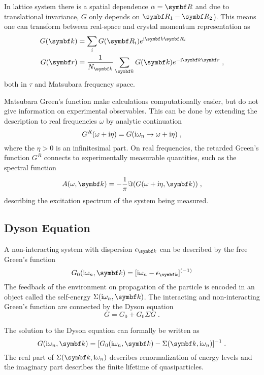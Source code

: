 \documentclass[../notes.tex]{subfiles}
\begin{document}
In lattice system there is a spatial dependence \(\alpha = \vb{R}\) and due to translational invariance, \(G\) only depends on \(\vb{R}_1 - \vb{R}_2\)).
This means one can transform between real-space and crystal momentum representation as
\begin{align}
	G (\vb{k}) &= \sum_i G(\vb{R}_i) e^{\iu \vb{k} \vb{R}_i} \\
	G(\vb{r}) &= \frac{1}{N_{\vb{k}}} \sum_{\vb{k}} G(\vb{k}) e^{-\iu \vb{k} \vb{r}} \;,
\end{align}
both in \(\tau\) and Matsubara frequency space.

Matsubara Green's function make calculations computationally easier, but do not give information on experimental observables.
This can be done by extending the description to real frequencies \(\omega\) by analytic continuation \cite{bruusManyBodyQuantumTheory2004}
\begin{equation}
	G^R (\omega + \mathrm{i} \eta) = G (\mathrm{i} \omega_n \to \omega + \mathrm{i} \eta) \;,
\end{equation}
where the \(\eta > 0\) is an infinitesimal part.
On real frequencies, the retarded Green's function \(G^R\) connects to experimentally measurable quantities, such as the spectral function
\begin{equation}
	A (\omega, \vb{k}) = -\frac{1}{\pi} \Im (G (\omega + \iu \eta, \vb{k})) \;,
\end{equation}
describing the excitation spectrum of the system being measured.

\subsection*{Dyson Equation}

A non-interacting system with dispersion \(\epsilon_{\vb{k}}\) can be described by the free Green's function
\begin{equation}
	G_0 (\iu \omega_n, \vb{k}) = [\iu \omega_n - \epsilon_{\vb{k}}]^{(-1)}
\end{equation}
The feedback of the environment on propagation of the particle is encoded in an object called the self-energy \(\Sigma (\iu \omega_n, \vb{k})\).
The interacting and non-interacting Green's function are connected by the Dyson equation
\begin{equation}
	G = G_0 + G_0 \Sigma G \;.
\end{equation}

The solution to the Dyson equation can formally be written as
\begin{equation}
	G (\iu \omega_n, \vb{k}) = [G_0 (\iu \omega_n, \vb{k}) - \Sigma (\vb{k}, \iu \omega_n)]^{-1} \;.
\end{equation}
The real part of \(\Sigma (\vb{k}, \iu \omega_n)\) describes renormalization of energy levels and the imaginary part describes the finite lifetime of quasiparticles.
\end{document}
